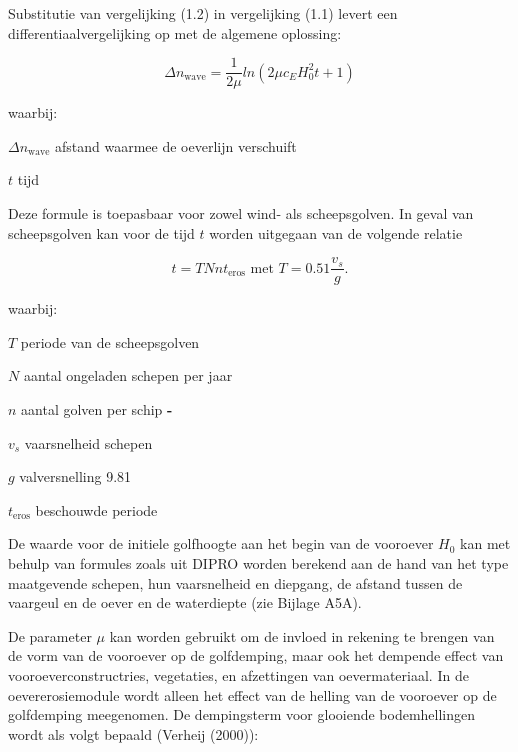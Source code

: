 Substitutie van vergelijking (1.2) in vergelijking (1.1) levert een differentiaalvergelijking op met de algemene oplossing:

\begin{equation}
\Delta n_\text{wave} = \frac{1}{2 \mu} ln ( 2 \mu c_E H_0^2 t + 1 )
\end{equation}

waarbij:

\begin{symbollist}
\item[$\Delta n_\text{wave}$] afstand waarmee de oeverlijn verschuift 
\item[$t$] tijd 
\end{symbollist}

Deze formule is toepasbaar voor zowel wind- als scheepsgolven.
In geval van scheepsgolven kan voor de tijd $t$ worden uitgegaan van de volgende relatie

\begin{equation}
t = T N n t_\text{eros} \text{ met } T = 0.51 \frac{v_s}{g} \text{.}
\end{equation}

waarbij:

\begin{symbollist}
\item[$T$] periode van de scheepsgolven 
\item[$N$] aantal ongeladen schepen per jaar \unitbrackets{-}
\item[$n$] aantal golven per schip \textbf{-}
\item[$v_s$] vaarsnelheid schepen 
\item[$g$] valversnelling 9.81 
\item[$t_\text{eros}$] beschouwde periode 
\end{symbollist}

De waarde voor de initiele golfhoogte aan het begin van de vooroever $H_0$ kan met behulp van formules zoals uit DIPRO worden berekend aan de hand van het type maatgevende schepen, hun vaarsnelheid en diepgang, de afstand tussen de vaargeul en de oever en de waterdiepte (zie Bijlage A5A).

De parameter $\mu$ kan worden gebruikt om de invloed in rekening te brengen van de vorm van de vooroever op de golfdemping, maar ook het dempende effect van vooroeverconstructries, vegetaties, en afzettingen van oevermateriaal.
In de oevererosiemodule wordt alleen het effect van de helling van de vooroever op de golfdemping meegenomen.
De dempingsterm voor glooiende bodemhellingen wordt als volgt bepaald (Verheij (2000)):

